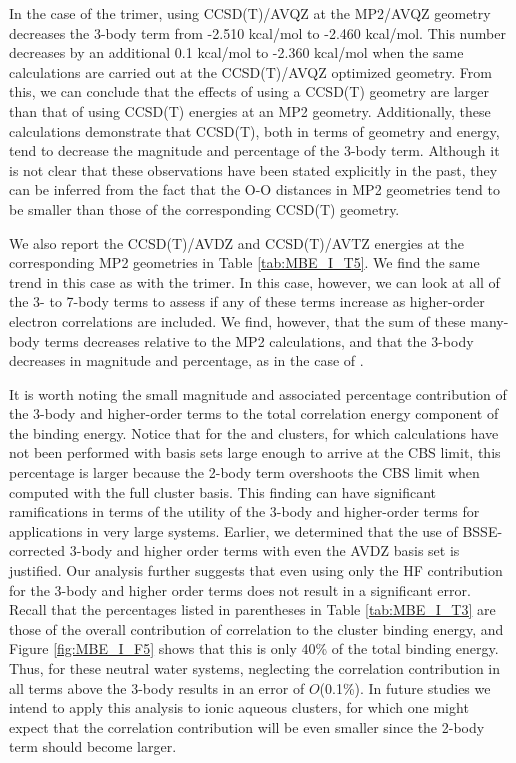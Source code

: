 \documentclass[11pt, proquest]{uwthesis}[2020/02/24]
\let\ce\ch
\newcommand{\textapprox}{\raisebox{0.5ex}{\texttildelow}}
\begin{document}

\par In the case of the trimer, using CCSD(T)/AVQZ at the MP2/AVQZ geometry decreases the 3-body term from -2.510 kcal/mol to -2.460 kcal/mol. This number decreases by an additional 0.1 kcal/mol to -2.360 kcal/mol when the same calculations are carried out at the CCSD(T)/AVQZ optimized geometry. From this, we can conclude that the effects of using a CCSD(T) geometry are larger than that of using CCSD(T) energies at an MP2 geometry. Additionally, these calculations demonstrate that CCSD(T), both in terms of geometry and energy, tend to decrease the magnitude and percentage of the 3-body term. Although it is not clear that these observations have been stated explicitly in the past, they can be inferred from the fact that the O-O distances in MP2 geometries tend to be smaller than those of the corresponding CCSD(T) geometry\autocite{miliordos_optimal_2013}.

\par We also report the CCSD(T)/AVDZ and CCSD(T)/AVTZ energies at the corresponding MP2 geometries in Table \ref{tab:MBE_I_T5}. We find the same trend in this case as with the trimer. In this case, however, we can look at all of the 3- to 7-body terms to assess if any of these terms increase as higher-order electron correlations are included. We find, however, that the sum of these many-body terms decreases relative to the MP2 calculations, and that the 3-body decreases in magnitude and percentage, as in the case of \ce{(H2O)3}.




\par It is worth noting the small magnitude and associated percentage contribution of the 3-body and higher-order terms to the total correlation energy component of the binding energy. Notice that for the \ce{(H2O)_{13}} and \ce{(H2O)_{16}} clusters, for which calculations have not been performed with basis sets large enough to arrive at the CBS limit, this percentage is larger because the 2-body term overshoots the CBS limit when computed with the full cluster basis. This finding can have significant ramifications in terms of the utility of the 3-body and higher-order terms for applications in very large systems. Earlier, we determined that the use of BSSE-corrected 3-body and higher order terms with even the AVDZ basis set is justified. Our analysis further suggests that even using only the HF contribution for the 3-body and higher order terms does not result in a significant error. Recall that the percentages listed in parentheses in Table \ref{tab:MBE_I_T3} are those of the overall contribution of correlation to the cluster binding energy, and Figure \ref{fig:MBE_I_F5} shows that this is only \textapprox40\% of the total binding energy. Thus, for these neutral water systems, neglecting the correlation contribution in all terms above the 3-body results in an error of $O$(0.1\%). In future studies we intend to apply this analysis to ionic aqueous clusters, for which one might expect that the correlation contribution will be even smaller since the 2-body term should become larger.
\end{document}
